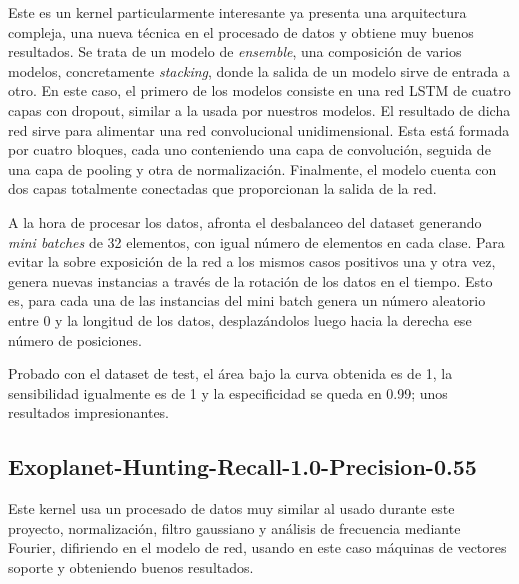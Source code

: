Este es un kernel particularmente interesante ya presenta una arquitectura compleja, una nueva técnica en el procesado de datos y obtiene muy buenos resultados. Se trata de un modelo de \textit{ensemble}, una composición de varios modelos, concretamente \textit{stacking}, donde la salida de un modelo sirve de entrada a otro. En este caso, el primero de los modelos consiste en una red LSTM de cuatro capas con dropout, similar a la usada por nuestros modelos. El resultado de dicha red sirve para alimentar una red convolucional unidimensional. Esta está formada por cuatro bloques, cada uno conteniendo una capa de convolución, seguida de una capa de pooling y otra de normalización. Finalmente, el modelo cuenta con dos capas totalmente conectadas que proporcionan la salida de la red.

A la hora de procesar los datos, afronta el desbalanceo del dataset generando \textit{mini batches} de 32 elementos, con igual número de elementos en cada clase. Para evitar la sobre exposición de la red a los mismos casos positivos una y otra vez, genera nuevas instancias a través de la rotación de los datos en el tiempo. Esto es, para cada una de las instancias del mini batch genera un número aleatorio entre 0 y la longitud de los datos, desplazándolos luego hacia la derecha ese número de posiciones. 

Probado con el dataset de test, el área bajo la curva obtenida es de 1, la sensibilidad igualmente es de 1 y la especificidad se queda en 0.99; unos resultados impresionantes. 

\subsection{Exoplanet-Hunting-Recall-1.0-Precision-0.55 \cite{Kaggle-kernel-Exoplanet-Hunting}} 

Este kernel usa un procesado de datos muy similar al usado durante este proyecto, normalización, filtro gaussiano y análisis de frecuencia mediante Fourier, difiriendo en el modelo de red, usando en este caso máquinas de vectores soporte y obteniendo buenos resultados.
